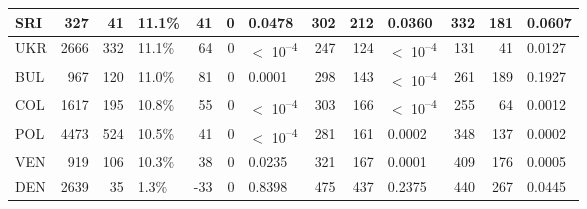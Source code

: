 \begin{tabular}{l|r|r|l|r|r|l|r|r|l|r|r|l}
\hline
SRI & 327 & 41 & 11.1\% & 41 & 0 & 0.0478 & 302 & 212 & 0.0360 & 332 & 181 & 0.0607\\
\hline
UKR & 2666 & 332 & 11.1\% & 64 & 0 & $<$ 10\textsuperscript{--4} & 247 & 124 & $<$ 10\textsuperscript{--4} & 131 & 41 & 0.0127\\
\hline
BUL & 967 & 120 & 11.0\% & 81 & 0 & 0.0001 & 298 & 143 & $<$ 10\textsuperscript{--4} & 261 & 189 & 0.1927\\
\hline
COL & 1617 & 195 & 10.8\% & 55 & 0 & $<$ 10\textsuperscript{--4} & 303 & 166 & $<$ 10\textsuperscript{--4} & 255 & 64 & 0.0012\\
\hline
POL & 4473 & 524 & 10.5\% & 41 & 0 & $<$ 10\textsuperscript{--4} & 281 & 161 & 0.0002 & 348 & 137 & 0.0002\\
\hline
VEN & 919 & 106 & 10.3\% & 38 & 0 & 0.0235 & 321 & 167 & 0.0001 & 409 & 176 & 0.0005\\
\hline
DEN & 2639 & 35 & 1.3\% & -33 & 0 & 0.8398 & 475 & 437 & 0.2375 & 440 & 267 & 0.0445\\
\hline
\end{tabular}

